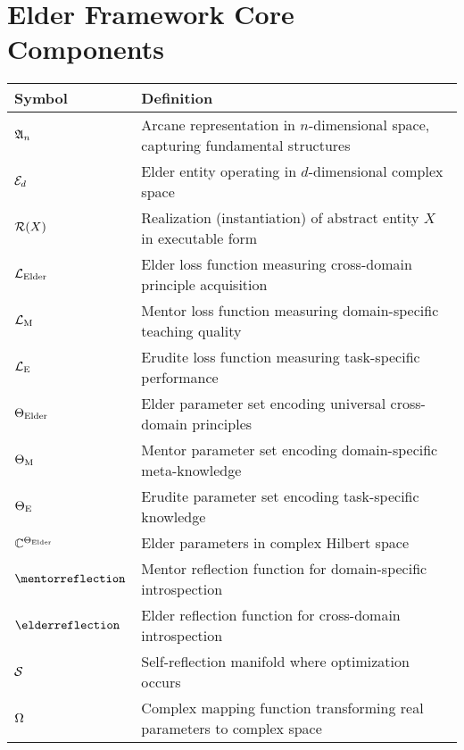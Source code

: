 \vspace{0.5cm}

\section*{Elder Framework Core Components}
\begin{center}
\begin{tabular}{>{\centering\arraybackslash}p{3cm} p{10cm}}
\hline
\textbf{Symbol} & \textbf{Definition} \\
\hline
$\mathfrak{A}_{n}$ & Arcane representation in $n$-dimensional space, capturing fundamental structures \\
$\mathcal{E}_{d}$ & Elder entity operating in $d$-dimensional complex space \\
$\mathcal{R}(X)$ & Realization (instantiation) of abstract entity $X$ in executable form \\
$\mathcal{L}_{\text{Elder}}$ & Elder loss function measuring cross-domain principle acquisition \\
$\mathcal{L}_{\text{M}}$ & Mentor loss function measuring domain-specific teaching quality \\
$\mathcal{L}_{\text{E}}$ & Erudite loss function measuring task-specific performance \\
$\Theta_{\text{Elder}}$ & Elder parameter set encoding universal cross-domain principles \\
$\Theta_{\text{M}}$ & Mentor parameter set encoding domain-specific meta-knowledge \\
$\Theta_{\text{E}}$ & Erudite parameter set encoding task-specific knowledge \\
$\mathbb{C}^{\Theta_{\text{Elder}}}$ & Elder parameters in complex Hilbert space \\
$\mentorreflection$ & Mentor reflection function for domain-specific introspection \\
$\elderreflection$ & Elder reflection function for cross-domain introspection \\
$\mathcal{S}$ & Self-reflection manifold where optimization occurs \\
$\Omega$ & Complex mapping function transforming real parameters to complex space \\
\hline
\end{tabular}
\end{center}

\vspace{0.5cm}

